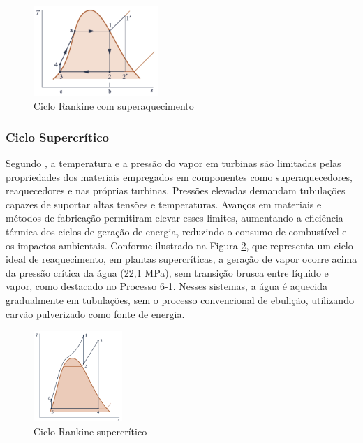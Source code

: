 \documentclass[
	article,			%
	11pt,				%
	oneside,			%
	a4paper,			%
	english,			%
	brazil,				%
	sumario=tradicional
	]{abntex2}
\begin{document}
\begin{figure}[h]
	\centering
	\includegraphics[width=0.42\textwidth]{./images/superaquecido.png}
	\caption{Ciclo Rankine com superaquecimento}
	\label{fig:superaquecido}
\end{figure}


\subsubsection{Ciclo Supercrítico}

Segundo , a temperatura e a pressão do vapor em turbinas são limitadas pelas propriedades dos materiais empregados em componentes como superaquecedores, reaquecedores e nas próprias turbinas. Pressões elevadas demandam tubulações capazes de suportar altas tensões e temperaturas. Avanços em materiais e métodos de fabricação permitiram elevar esses limites, aumentando a eficiência térmica dos ciclos de geração de energia, reduzindo o consumo de combustível e os impactos ambientais. Conforme ilustrado na Figura \ref{fig:supercritico}, que representa um ciclo ideal de reaquecimento, em plantas supercríticas, a geração de vapor ocorre acima da pressão crítica da água (22,1 MPa), sem transição brusca entre líquido e vapor, como destacado no Processo 6-1. Nesses sistemas, a água é aquecida gradualmente em tubulações, sem o processo convencional de ebulição, utilizando carvão pulverizado como fonte de energia.

\begin{figure}[h]
	\centering
	\includegraphics[width=0.3\textwidth]{./images/supercritico.png}
	\caption{Ciclo Rankine supercrítico}
	\label{fig:supercritico}
\end{figure}
\end{document}
